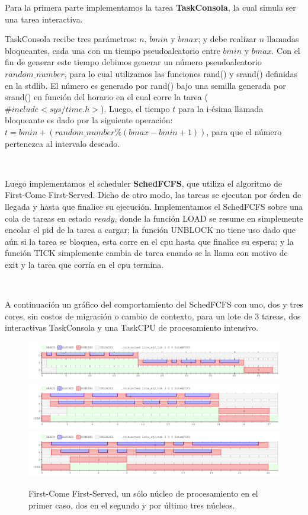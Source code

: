 Para la primera parte implementamos la tarea \textbf{TaskConsola}, la cual simula ser una tarea interactiva.

TaskConsola recibe tres parámetros: $n$, $bmin$ y $bmax$; y debe realizar $n$ llamadas bloqueantes, cada una con un tiempo pseudoaleatorio
entre $bmin$ y $bmax$. Con el fin de generar este tiempo debimos generar un número pseudoaleatorio $random\_number$, para lo cual utilizamos las funciones rand() y srand() definidas en la stdlib. El número es generado por rand() bajo una semilla generada por srand() en función del horario en el cual corre la tarea ($\#include <sys/time.h>$). Luego, el tiempo $t$ para la i-ésima llamada bloqueante es dado por la siguiente operación: $t = bmin + (random\_number \% (bmax-bmin+1))$, para que el número pertenezca al intervalo deseado.

~

Luego implementamos el scheduler \textbf{SchedFCFS}, que utiliza el algoritmo de First-Come First-Served. Dicho de otro modo, las tareas se ejecutan por órden de llegada y hasta que finalice su ejecución. Implementamos el SchedFCFS sobre una cola de tareas en estado $ready$, donde la función LOAD se resume en simplemente encolar el pid de la tarea a cargar; la función UNBLOCK no tiene uso dado que aún si la tarea se bloquea, esta corre en el cpu hasta que finalice su espera; y la función TICK simplemente cambia de tarea cuando se la llama con motivo de exit y la tarea que corría en el cpu termina.

~

A continuación un gráfico del comportamiento del SchedFCFS con uno, dos y tres cores, sin costos de migración o cambio de contexto, para un lote de 3 tareas, dos interactivas TaskConsola y una TaskCPU de procesamiento intensivo.

\begin{figure}[H]
\centering\includegraphics[width=18 cm]{graficos/ej2FCFS1.png}
\centering\includegraphics[width=18 cm]{graficos/ej2FCFS2.png}
\centering\includegraphics[width=18 cm]{graficos/ej2FCFS3.png}
\caption{First-Come First-Served, un sólo núcleo de procesamiento en el primer caso, dos en el segundo y por último tres núcleos.}
\end{figure}

